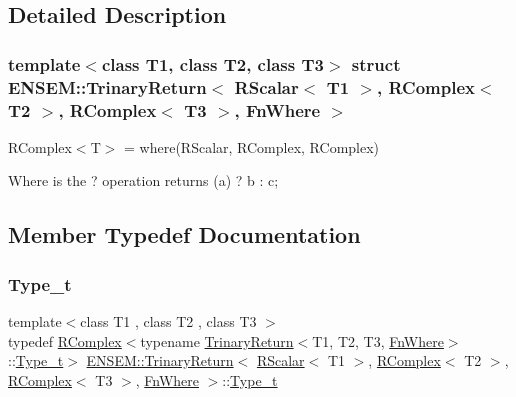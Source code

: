\subsection{Detailed Description}
\subsubsection*{template$<$class T1, class T2, class T3$>$\newline
struct E\+N\+S\+E\+M\+::\+Trinary\+Return$<$ R\+Scalar$<$ T1 $>$, R\+Complex$<$ T2 $>$, R\+Complex$<$ T3 $>$, Fn\+Where $>$}

R\+Complex$<$\+T$>$ = where(\+R\+Scalar, R\+Complex, R\+Complex) 

Where is the ? operation returns (a) ? b \+: c; 

\subsection{Member Typedef Documentation}
\mbox{\label{structENSEM_1_1TrinaryReturn_3_01RScalar_3_01T1_01_4_00_01RComplex_3_01T2_01_4_00_01RComplex_3_01T3_01_4_00_01FnWhere_01_4_a0ff54f19b5e93daa3871e94f3d83b657}} 
\subsubsection{\texorpdfstring{Type\_t}{Type\_t}\hspace{0.1cm}{\footnotesize\ttfamily [1/3]}}
{\footnotesize\ttfamily template$<$class T1 , class T2 , class T3 $>$ \\
typedef \mbox{\hyperlink{classENSEM_1_1RComplex}{R\+Complex}}$<$typename \mbox{\hyperlink{structENSEM_1_1TrinaryReturn}{Trinary\+Return}}$<$T1, T2, T3, \mbox{\hyperlink{structENSEM_1_1FnWhere}{Fn\+Where}}$>$\+::\mbox{\hyperlink{structENSEM_1_1TrinaryReturn_3_01RScalar_3_01T1_01_4_00_01RComplex_3_01T2_01_4_00_01RComplex_3_01T3_01_4_00_01FnWhere_01_4_a0ff54f19b5e93daa3871e94f3d83b657}{Type\+\_\+t}}$>$ \mbox{\hyperlink{structENSEM_1_1TrinaryReturn}{E\+N\+S\+E\+M\+::\+Trinary\+Return}}$<$ \mbox{\hyperlink{classENSEM_1_1RScalar}{R\+Scalar}}$<$ T1 $>$, \mbox{\hyperlink{classENSEM_1_1RComplex}{R\+Complex}}$<$ T2 $>$, \mbox{\hyperlink{classENSEM_1_1RComplex}{R\+Complex}}$<$ T3 $>$, \mbox{\hyperlink{structENSEM_1_1FnWhere}{Fn\+Where}} $>$\+::\mbox{\hyperlink{structENSEM_1_1TrinaryReturn_3_01RScalar_3_01T1_01_4_00_01RComplex_3_01T2_01_4_00_01RComplex_3_01T3_01_4_00_01FnWhere_01_4_a0ff54f19b5e93daa3871e94f3d83b657}{Type\+\_\+t}}}

